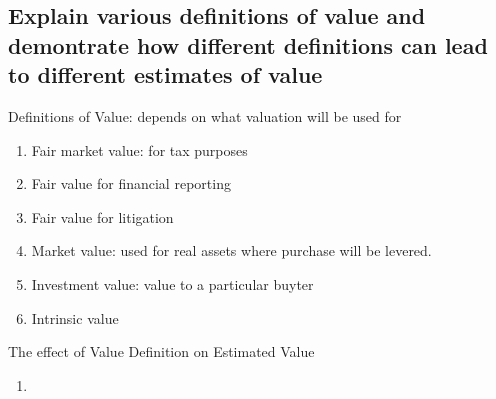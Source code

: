 \documentclass{article}
\newcommand{\be}{\begin{enumerate}}
\newcommand{\ee}{\end{enumerate}}
\begin{document}
\subsection{Explain various definitions of value and demontrate how different definitions
can lead to different estimates of value}
Definitions of Value: depends on what valuation will be used for
\be
    \item Fair market value: for tax purposes
    \item Fair value for financial reporting
    \item Fair value for litigation
    \item Market value: used for real assets where purchase will be levered.
    \item Investment value: value to a particular buyter
    \item Intrinsic value
\ee
The effect of Value Definition on Estimated Value
\be
    \item 
\ee
\end{document}

